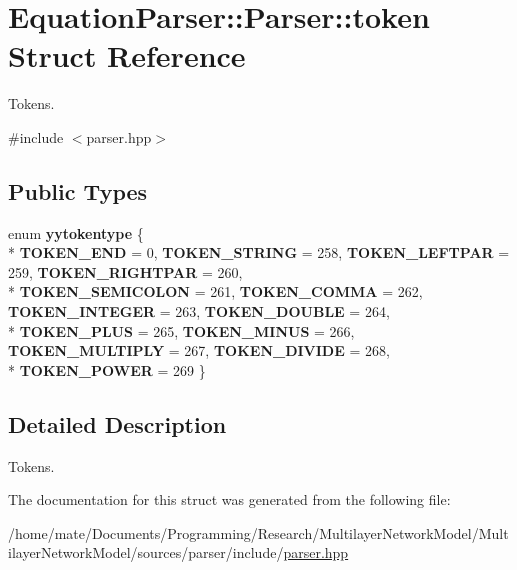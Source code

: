 \hypertarget{structEquationParser_1_1Parser_1_1token}{}\section{Equation\+Parser\+:\+:Parser\+:\+:token Struct Reference}
\label{structEquationParser_1_1Parser_1_1token}


Tokens.  




{\ttfamily \#include $<$parser.\+hpp$>$}

\subsection*{Public Types}
\begin{DoxyCompactItemize}
\item 
enum {\bfseries yytokentype} \{ \\*
{\bfseries T\+O\+K\+E\+N\+\_\+\+E\+ND} = 0, 
{\bfseries T\+O\+K\+E\+N\+\_\+\+S\+T\+R\+I\+NG} = 258, 
{\bfseries T\+O\+K\+E\+N\+\_\+\+L\+E\+F\+T\+P\+AR} = 259, 
{\bfseries T\+O\+K\+E\+N\+\_\+\+R\+I\+G\+H\+T\+P\+AR} = 260, 
\\*
{\bfseries T\+O\+K\+E\+N\+\_\+\+S\+E\+M\+I\+C\+O\+L\+ON} = 261, 
{\bfseries T\+O\+K\+E\+N\+\_\+\+C\+O\+M\+MA} = 262, 
{\bfseries T\+O\+K\+E\+N\+\_\+\+I\+N\+T\+E\+G\+ER} = 263, 
{\bfseries T\+O\+K\+E\+N\+\_\+\+D\+O\+U\+B\+LE} = 264, 
\\*
{\bfseries T\+O\+K\+E\+N\+\_\+\+P\+L\+US} = 265, 
{\bfseries T\+O\+K\+E\+N\+\_\+\+M\+I\+N\+US} = 266, 
{\bfseries T\+O\+K\+E\+N\+\_\+\+M\+U\+L\+T\+I\+P\+LY} = 267, 
{\bfseries T\+O\+K\+E\+N\+\_\+\+D\+I\+V\+I\+DE} = 268, 
\\*
{\bfseries T\+O\+K\+E\+N\+\_\+\+P\+O\+W\+ER} = 269
 \}\hypertarget{structEquationParser_1_1Parser_1_1token_a5696bebf3a1264ccfc2cf7c9a05a01c6}{}\label{structEquationParser_1_1Parser_1_1token_a5696bebf3a1264ccfc2cf7c9a05a01c6}

\end{DoxyCompactItemize}


\subsection{Detailed Description}
Tokens. 

The documentation for this struct was generated from the following file\+:\begin{DoxyCompactItemize}
\item 
/home/mate/\+Documents/\+Programming/\+Research/\+Multilayer\+Network\+Model/\+Multilayer\+Network\+Model/sources/parser/include/\hyperlink{parser_8hpp}{parser.\+hpp}\end{DoxyCompactItemize}
